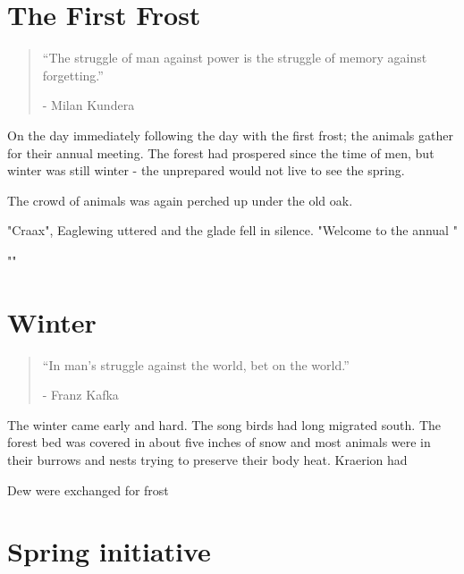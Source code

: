 \documentclass[smalldemyvopaper,11pt,twoside,onecolumn,openright,extrafontsizes]{memoir}
\begin{document}
\chapter{The First Frost}

\vspace{-1.3cm}
\begin{localsize}{10}
	\begin{quote}
		“The struggle of man against power is the struggle of memory against forgetting.”
		\begin{flushright}- Milan Kundera \end{flushright}
	\end{quote} 
\end{localsize}
\vspace{1cm}

On the day immediately following the day with the first frost; the animals gather for their annual meeting. The forest had prospered since the time of men, but winter was still winter - the unprepared would not live to see the spring. 

The crowd of animals was again perched up under the old oak. 

"Craax", Eaglewing uttered and the glade fell in silence. "Welcome to the annual "


""  




\chapter{Winter}

\vspace{-1.3cm}
\begin{localsize}{10}
	\begin{quote}
		“In man's struggle against the world, bet on the world.”
		\begin{flushright}- Franz Kafka \end{flushright}
	\end{quote} 
\end{localsize}
\vspace{1cm}

The winter came early and hard. The song birds had long migrated south. The forest bed was covered in about five inches of snow and most animals were in their burrows and nests trying to preserve their body heat. Kraerion had   

 Dew were exchanged for frost


\chapter{Spring initiative}
\end{document}
